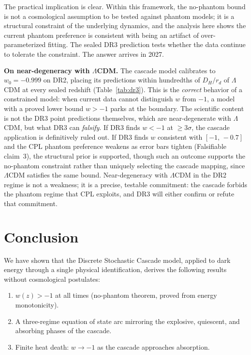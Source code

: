 \documentclass[12pt,a4paper]{article}
\theoremstyle{plain}
\theoremstyle{definition}
\begin{document}
The practical implication is clear. Within this framework, the no-phantom bound
is not a cosmological assumption to be tested against phantom models; it is a
structural constraint of the underlying dynamics, and the analysis here shows the
current phantom preference is consistent with being an artifact of
over-parameterized fitting. The sealed DR3 prediction tests whether the data
continue to tolerate the constraint. The answer arrives in 2027.

\medskip
\noindent\textbf{On near-degeneracy with $\Lambda$CDM.}
The cascade model calibrates to $w_0 = -0.999$ on DR2, placing its predictions
within hundredths of $D_H/r_d$ of $\Lambda$CDM at every sealed redshift
(Table~\ref{tab:dr3}).
This is the \emph{correct} behavior of a constrained model: when current data
cannot distinguish $w$ from $-1$, a model with a proved lower bound $w > -1$
parks at the boundary.
The scientific content is not the DR3 point predictions themselves, which are
near-degenerate with $\Lambda$CDM, but what DR3 can \emph{falsify}.
If DR3 finds $w < -1$ at $\geq 3\sigma$, the cascade application is definitively
ruled out.
If DR3 finds $w$ consistent with $[-1,\,-0.7]$ and the CPL phantom preference
weakens as error bars tighten (Falsifiable claim~3), the structural prior is
supported, though such an outcome supports the no-phantom constraint rather
than uniquely selecting the cascade mapping, since $\Lambda$CDM satisfies the
same bound.
Near-degeneracy with $\Lambda$CDM in the DR2 regime is not a weakness; it is a
precise, testable commitment: the cascade forbids the phantom regime that CPL
exploits, and DR3 will either confirm or refute that commitment.

\section{Conclusion}
\label{sec:conclusion}

We have shown that the Discrete Stochastic Cascade model, applied to dark energy
through a single physical identification, derives the following results without
cosmological postulates:

\begin{enumerate}
\item $w(z) > -1$ at all times (no-phantom theorem, proved from energy monotonicity).
\item A three-regime equation of state arc mirroring the explosive, quiescent, and
  absorbing phases of the cascade.
\item Finite heat death: $w \to -1$ as the cascade approaches absorption.
\end{enumerate}
\end{document}
